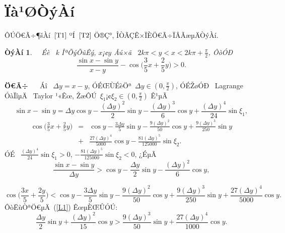 \documentclass[12pt,openany,CJK,oneside]{cctbook}
\newtheorem{lem}  {{\heiti ÒýÀí}}[chapter]
\begin{document}
{\section{\kaishu Ïà¹ØÒýÀí}

ÔÚÖ€Ã÷¶šÀí\ $\ref{T1}$ ºÍ\ $\ref{T2}$ Ö®Ç°, ÎÒÃÇÊ×ÏÈÖ€Ã÷ÏÂÃæµÄÒýÀí.
\begin{lem}
{\upshape\kaishu ~~Éè \ \emph{k} ÎªÕýÕûÊý, $x$¡¢$y$ Âú×ã \ $2k\pi<y<x<2k\pi+\frac{\pi}{2}$, ÔòÓÐ
\begin{equation}\label{L1}
  \frac{\sin x-\sin y}{x-y}-\cos\Big(\frac{3}{5}x+\frac{2}{5}y\Big)>0.
\end{equation}
}\label{lemma}
\end{lem}

{\heiti \textbf{Ö€Ã÷} }~~ Áî \ $\Delta y=x-y$, ÓÉŒÙÉèÖª\ $\Delta y\in(0,\frac{\pi}{2})$, ÓÉŽøÓÐ \ Lagrange ÓàÏîµÄ \ Taylor ¹«Êœ, ŽæÔÚ\ $\xi_1$¡¢$\xi_2\in(0,\frac{\pi}{2})$ Ê¹µÃ
  \begin{equation}
    \sin x-\sin y=\Delta y\cos y-\frac{(\Delta y)^2}{2}\sin y-\frac{(\Delta y)^3}{6}\cos y+\frac{(\Delta y)^4}{24}\sin\xi_1,
  \end{equation}
  \begin{eqnarray*}
  \cos\Big(\frac{3}{5}x+\frac{2}{5}y\Big) &=& \cos y-\frac{3\Delta y}{5}\sin y-\frac{9(\Delta y)^2}{50}\cos y+\frac{9(\Delta y)^3}{250}\sin y \\
     &+&     \frac{27(\Delta y)^4}{5000}\cos y-\frac{81(\Delta y)^5}{125000}\sin\xi_2.
  \end{eqnarray*}
ÓÉ \ $\frac{(\Delta y)^4}{24}\sin\xi_1>0$, $-\frac{81(\Delta y)^5}{125000}\sin\xi_2<0$, ¿ÉµÃ
\begin{equation}
  \frac{\sin x-\sin y}{\Delta y}>\cos y-\frac{\Delta y}{2}\sin y-\frac{(\Delta y)^2}{6}\cos y,
 \end{equation}

\begin{equation}
\cos\Big(\frac{3x}{5}+\frac{2y}{5}\Big)<\cos y-\frac{3\Delta y}{5}\sin y-\frac{9(\Delta y)^2}{50}\cos y+\frac{9(\Delta y)^3}{250}\sin y+\frac{27(\Delta y)^4}{5000}\cos y.
\end{equation}
 ÔòËùÒªÖ€µÄ\ (\ref{L1}) ÊœµÈŒÛÓÚ:
\begin{equation}\label{L01}
  \frac{\Delta y}{2}\sin y+\frac{(\Delta y)^2}{15}\cos y>\frac{9(\Delta y)^3}{50}\sin y+\frac{27(\Delta y)^4}{1000}\cos y.
\end{equation}

}
\end{document}

